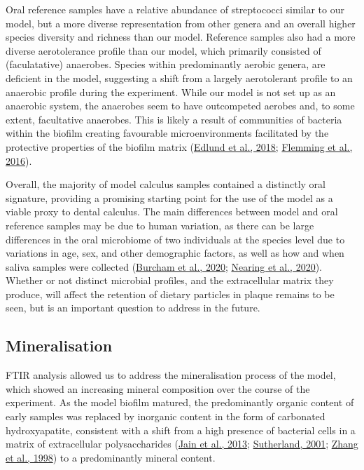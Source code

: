 \documentclass[
  b5paper,
]{book}
\begin{document}
Oral reference samples have a relative abundance of streptococci similar
to our model, but a more diverse representation from other genera and an
overall higher species diversity and richness than our model. Reference
samples also had a more diverse aerotolerance profile than our model,
which primarily consisted of (faculatative) anaerobes. Species within
predominantly aerobic genera, are deficient in the model, suggesting a
shift from a largely aerotolerant profile to an anaerobic profile during
the experiment. While our model is not set up as an anaerobic system,
the anaerobes seem to have outcompeted aerobes and, to some extent,
facultative anaerobes. This is likely a result of communities of
bacteria within the biofilm creating favourable microenvironments
facilitated by the protective properties of the biofilm matrix
(\protect\hyperlink{ref-edlundUncoveringComplex2018}{Edlund et al.,
2018}; \protect\hyperlink{ref-flemmingBiofilmsEmergent2016}{Flemming et
al., 2016}).

Overall, the majority of model calculus samples contained a distinctly
oral signature, providing a promising starting point for the use of the
model as a viable proxy to dental calculus. The main differences between
model and oral reference samples may be due to human variation, as there
can be large differences in the oral microbiome of two individuals at
the species level due to variations in age, sex, and other demographic
factors, as well as how and when saliva samples were collected
(\protect\hyperlink{ref-burchamPatternsOral2020}{Burcham et al., 2020};
\protect\hyperlink{ref-nearingAssessingVariation2020}{Nearing et al.,
2020}). Whether or not distinct microbial profiles, and the
extracellular matrix they produce, will affect the retention of dietary
particles in plaque remains to be seen, but is an important question to
address in the future.

\hypertarget{mineralisation}{%
\subsection{Mineralisation}\label{mineralisation}}

FTIR analysis allowed us to address the mineralisation process of the
model, which showed an increasing mineral composition over the course of
the experiment. As the model biofilm matured, the predominantly organic
content of early samples was replaced by inorganic content in the form
of carbonated hydroxyapatite, consistent with a shift from a high
presence of bacterial cells in a matrix of extracellular polysaccharides
(\protect\hyperlink{ref-jainIsolationCharacterization2013}{Jain et al.,
2013}; \protect\hyperlink{ref-sutherlandBiofilmMatrix2001}{Sutherland,
2001}; \protect\hyperlink{ref-zhangMeasurementPolysaccharides1998}{Zhang
et al., 1998}) to a predominantly mineral content.
\end{document}
